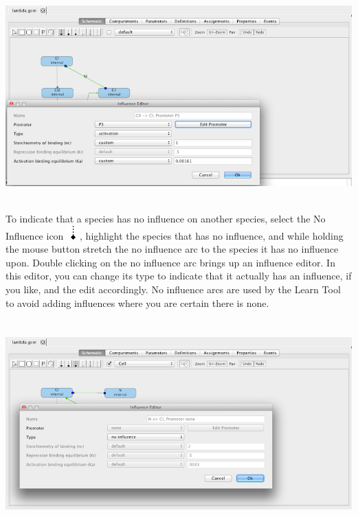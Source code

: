 \documentclass[titlepage,11pt]{article}
\begin{document}
\begin{center}
\includegraphics[height=80mm]{screenshots/activation}
\end{center}

To indicate that a species has no influence on another species, select the No Influence icon 
\includegraphics{../gui/icons/modelview/no_influence}, highlight the species that has no influence, and while holding the mouse button stretch the no influence arc to the species it has no influence upon.  Double clicking on the no influence arc brings up an influence editor.  In this editor, you can change its type to indicate that it actually has an influence, if you like, and the edit accordingly.  No influence arcs are used by the Learn Tool to avoid adding influences where you are certain there is none.

\begin{center}
\includegraphics[height=80mm]{screenshots/noInfluence}
\end{center}
\end{document}
